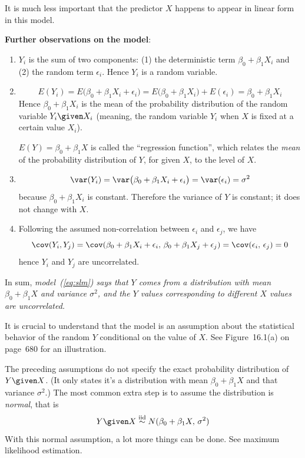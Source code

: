 \documentclass[12pt]{article}
\begin{document}
It is much less important that
the predictor $X$ happens to appear in linear form in this model.

\textbf{Further observations on the model}:

\begin{enumerate}
\item $Y_i$ is the sum of two components: (1) the
deterministic term $\beta_0 + \beta_1 X_i$ and (2) the random term
$\epsilon_i$. Hence $Y_i$ is a random variable.

\item
\[
E(Y_i) = E\bigl(\beta_0 + \beta_1 X_i + \epsilon_i\bigr)
    = E\bigl(\beta_0 + \beta_1 X_i) + E(\epsilon_i)
    = \beta_0 + \beta_1 X_i
\]
Hence $\beta_0 + \beta_1 X_i$ is the mean of the probability
distribution of the random variable $Y_i \given X_i$
(meaning, the random variable $Y_i$ when $X$ is fixed at a certain value
$X_i$).

$E(Y) = \beta_0 + \beta_1 X$ is called the ``regression function'',
which relates the \emph{mean} of the probability distribution of $Y$, for given
$X$, to the level of $X$.

\item
\[
\var(Y_i)
= \var\bigl(\beta_0 + \beta_1 X_i + \epsilon_i\bigr)
= \var(\epsilon_i)
= \sigma^2
\]
because $\beta_0 + \beta_1 X_i$ is constant.
Therefore the variance of $Y$ is constant; it does not change with $X$.

\item
Following the assumed non-correlation between $\epsilon_i$ and
$\epsilon_j$, we have
\[
\cov(Y_i, Y_j)
= \cov(\beta_0 + \beta_1 X_i + \epsilon_i,\,
        \beta_0 + \beta_1 X_j + \epsilon_j)
= \cov(\epsilon_i,\, \epsilon_j)
= 0
\]
hence $Y_i$ and $Y_j$ are uncorrelated.
\end{enumerate}

In sum, \emph{model~(\ref{eq:slm}) says that
$Y$ comes from a distribution with mean
$\beta_0 + \beta_1 X$ and variance $\sigma^2$,
and the $Y$ values corresponding to different $X$ values are
uncorrelated.}

It is crucial to understand that the model is an assumption
about the statistical behavior of the random $Y$ conditional
on the value of $X$.
See Figure~16.1(a) on page~680 for an illustration.

The preceding assumptions do not specify the exact probability distribution of
$Y\given X$.
(It only states it's a distribution with mean $\beta_0 + \beta_1 X$
and that variance $\sigma^2$.)
The most common extra step is to assume the distribution is
\emph{normal}, that is
\[
Y\given X \overset{\text{iid}}{\sim} N(\beta_0 + \beta_1 X,\, \sigma^2)
\]
With this normal assumption,
a lot more things can be done.
See maximum likelihood estimation.
\end{document}

